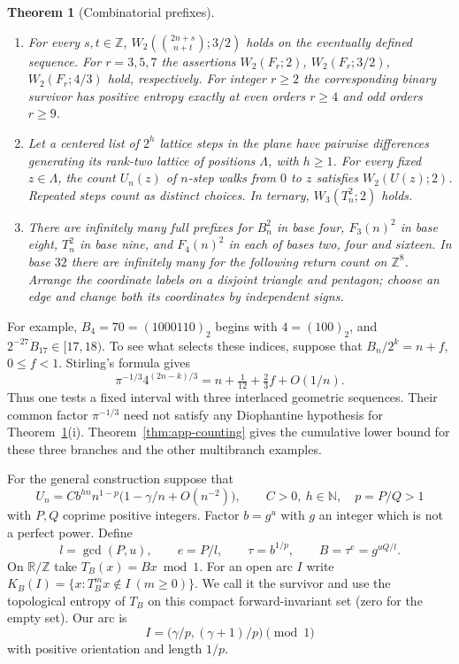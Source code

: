 \documentclass[11pt,reqno,a4paper]{amsart}
\newtheorem{theorem}{Theorem}[section]
\theoremstyle{remark}
\begin{document}
\begin{theorem}[Combinatorial prefixes]\label{thm:headline}
\leavevmode\begin{enumerate}
\item For every \(s,t\in\mathbb Z\),
 \(W_2(\binom{2n+s}{n+t};3/2)\) holds on the eventually defined sequence.
 For \(r=3,5,7\) the assertions \(W_2(F_r;2)\),
 \(W_2(F_r;3/2)\), \(W_2(F_r;4/3)\) hold, respectively.
 For integer \(r\ge2\) the corresponding binary survivor has positive
 entropy exactly at even orders \(r\ge4\) and odd orders \(r\ge9\).
\item Let a centered list of \(2^h\) lattice steps in the plane have
 pairwise differences generating its rank-two lattice of positions \(\Lambda\), with \(h\ge1\).
 For every fixed \(z\in\Lambda\), the count \(U_n(z)\) of
 \(n\)-step walks from \(0\) to \(z\) satisfies \(W_2(U(z);2)\).
 Repeated steps count as distinct choices. In ternary, \(W_3(T_n^2;2)\) holds.
\item There are infinitely many full prefixes for \(B_n^2\) in base four,
 \(F_3(n)^2\) in base eight, \(T_n^2\) in base nine, and \(F_4(n)^2\)
 in each of bases two, four and sixteen. In base \(32\) there are
 infinitely many for the following return count on \(\mathbb Z^8\).
 Arrange the coordinate labels on a disjoint triangle and pentagon;
 choose an edge and change both its coordinates by independent signs.
\end{enumerate}
\end{theorem}

For example, \(B_4=70=(1000110)_2\) begins with \(4=(100)_2\), and \(2^{-27}B_{17}\in[17,18)\). To see what selects these indices, suppose that \(B_n/2^k=n+f\), \(0\le f<1\). Stirling's formula gives
\[
 \pi^{-1/3}4^{(2n-k)/3}=n+\tfrac1{12}+\tfrac23 f+O(1/n).
\]
Thus one tests a fixed interval with three interlaced geometric
sequences. Their common factor \(\pi^{-1/3}\) need not satisfy any
Diophantine hypothesis for Theorem~\ref{thm:headline}(i).
Theorem~\ref{thm:app-counting} gives the cumulative lower bound for
these three branches and the other multibranch examples.

For the general construction suppose that
\begin{equation}\label{eq:aligned}
 U_n=Cb^{hn}n^{1-p}\bigl(1-\gamma/n+O(n^{-2})\bigr),
 \qquad C>0,\ h\in\mathbb N,\quad p=P/Q>1
\end{equation}
with \(P,Q\) coprime positive integers. Factor \(b=g^u\) with \(g\)
an integer which is not a perfect power. Define
\begin{equation}\label{eq:branch}
 l=\gcd(P,u),\qquad e=P/l,\qquad \tau=b^{1/p},\qquad B=\tau^e=g^{uQ/l}.
\end{equation}
On \(\mathbb R/\mathbb Z\) take \(T_B(x)=Bx\bmod1\).
For an open arc \(I\) write \(K_B(I)=\{x:T_B^m x\notin I\ (m\ge0)\}\).
We call it the survivor and use the topological entropy of \(T_B\)
on this compact forward-invariant set (zero for the empty set).
Our arc is
\begin{equation}\label{eq:hole}
 I=\bigl(\gamma/p,(\gamma+1)/p\bigr)\pmod1
\end{equation}
with positive orientation and length \(1/p\).
\end{document}
